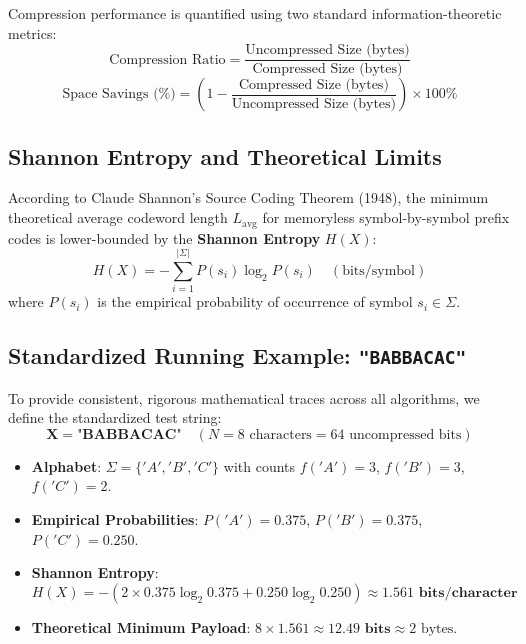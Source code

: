 \documentclass[12pt,a4paper]{article}
\begin{document}
Compression performance is quantified using two standard information-theoretic metrics:
\begin{equation}
\label{eq:ratio}
\text{Compression Ratio} = \frac{\text{Uncompressed Size (bytes)}}{\text{Compressed Size (bytes)}}
\end{equation}
\begin{equation}
\label{eq:savings}
\text{Space Savings (\%)} = \left( 1 - \frac{\text{Compressed Size (bytes)}}{\text{Uncompressed Size (bytes)}} \right) \times 100\%
\end{equation}

\subsection{Shannon Entropy and Theoretical Limits}
According to Claude Shannon's Source Coding Theorem (1948), the minimum theoretical average codeword length $L_{\text{avg}}$ for memoryless symbol-by-symbol prefix codes is lower-bounded by the \textbf{Shannon Entropy} $H(X)$:
\begin{equation}
H(X) = -\sum_{i=1}^{|\Sigma|} P(s_i) \log_2 P(s_i) \quad (\text{bits/symbol})
\end{equation}
where $P(s_i)$ is the empirical probability of occurrence of symbol $s_i \in \Sigma$. 

\subsection{Standardized Running Example: \texttt{"BABBACAC"}}
To provide consistent, rigorous mathematical traces across all algorithms, we define the standardized test string:
\begin{equation}
\mathbf{X = \text{"BABBACAC"}} \quad (N = 8\text{ characters} = 64\text{ uncompressed bits})
\end{equation}
\begin{itemize}
    \item \textbf{Alphabet}: $\Sigma = \{'A', 'B', 'C'\}$ with counts $f('A')=3$, $f('B')=3$, $f('C')=2$.
    \item \textbf{Empirical Probabilities}: $P('A') = 0.375$, $P('B') = 0.375$, $P('C') = 0.250$.
    \item \textbf{Shannon Entropy}:
    \begin{equation}
    H(X) = -\left( 2 \times 0.375 \log_2 0.375 + 0.250 \log_2 0.250 \right) \approx \mathbf{1.561\text{ bits/character}}
    \end{equation}
    \item \textbf{Theoretical Minimum Payload}: $8 \times 1.561 \approx \mathbf{12.49\text{ bits}} \approx 2\text{ bytes}$.
\end{itemize}
\end{document}

